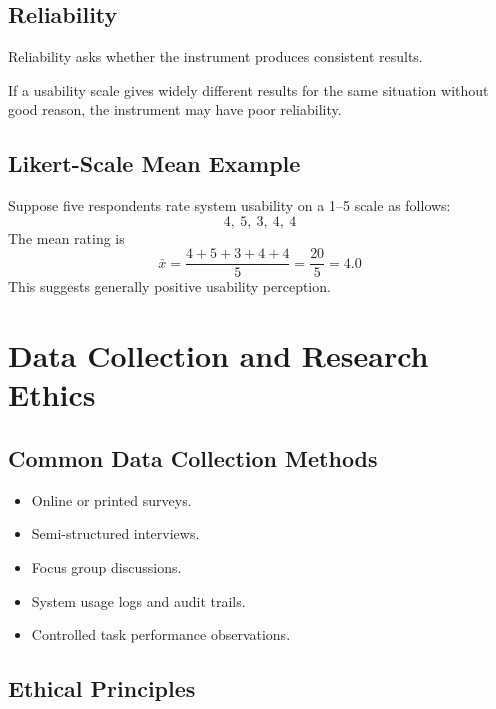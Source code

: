 \documentclass[11pt,a4paper]{article}
\begin{document}
\subsection{Reliability}

Reliability asks whether the instrument produces consistent results.

\begin{conceptbox}
If a usability scale gives widely different results for the same situation without good reason, the instrument may have poor reliability.
\end{conceptbox}

\subsection{Likert-Scale Mean Example}

\begin{examplebox}
Suppose five respondents rate system usability on a 1--5 scale as follows:
\[
4,\ 5,\ 3,\ 4,\ 4
\]
The mean rating is
\[
\bar{x} = \frac{4+5+3+4+4}{5} = \frac{20}{5} = 4.0
\]
This suggests generally positive usability perception.
\end{examplebox}

\section{Data Collection and Research Ethics}

\subsection{Common Data Collection Methods}

\begin{itemize}[leftmargin=*]
  \item Online or printed surveys.
  \item Semi-structured interviews.
  \item Focus group discussions.
  \item System usage logs and audit trails.
  \item Controlled task performance observations.
\end{itemize}

\subsection{Ethical Principles}
\end{document}
